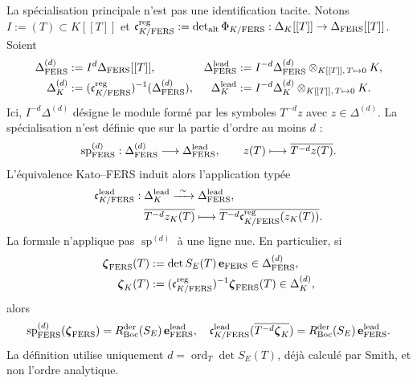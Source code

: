La spécialisation principale n'est pas une identification tacite. Notons
$I:=(T)\subset K[[T]]$ et
$\mathfrak c_{K/{\rm FERS}}^{\rm reg}:=
\det_{\rm alt}\Phi_{K/{\rm FERS}}:\Delta_K[[T]]\to
\Delta_{\rm FERS}[[T]]$. Soient
\begin{equation}\label{eq:pdf2-bsd-lineas-leading}
 \begin{aligned}
  \Delta_{\rm FERS}^{(d)}&:=I^d\Delta_{\rm FERS}[[T]],&
  \Delta_{\rm FERS}^{\rm lead}
    &:=I^{-d}\Delta_{\rm FERS}^{(d)}
       \otimes_{K[[T]],\,T\mapsto0}K,\\
  \Delta_K^{(d)}&:=(\mathfrak c_{K/{\rm FERS}}^{\rm reg})^{-1}
       (\Delta_{\rm FERS}^{(d)}),&
  \Delta_K^{\rm lead}
    &:=I^{-d}\Delta_K^{(d)}
       \otimes_{K[[T]],\,T\mapsto0}K.
 \end{aligned}
\end{equation}
Ici, $I^{-d}\Delta^{(d)}$ désigne le module formé par les symboles
$T^{-d}z$ avec $z\in\Delta^{(d)}$. La spécialisation n'est définie
que sur la partie d'ordre au moins $d$ :
\begin{equation}\label{eq:pdf2-bsd-sp-leading-tipado}
 \operatorname{sp}^{(d)}_{\rm FERS}:
 \Delta_{\rm FERS}^{(d)}\longrightarrow
 \Delta_{\rm FERS}^{\rm lead},
 \qquad
 z(T)\longmapsto
 \overline{T^{-d}z(T)}.
\end{equation}
L'équivalence Kato--FERS induit alors l'application typée
\begin{equation}\label{eq:pdf2-bsd-c-k-fers-leading}
 \begin{aligned}
 \mathfrak c_{K/{\rm FERS}}^{\rm lead}:{}
 &\Delta_K^{\rm lead}\xrightarrow{\ \sim\ }
   \Delta_{\rm FERS}^{\rm lead},\\
 &\overline{T^{-d}z_K(T)}\longmapsto
   \overline{T^{-d}
   \mathfrak c_{K/{\rm FERS}}^{\rm reg}(z_K(T))}.
 \end{aligned}
\end{equation}
La formule n'applique pas $\operatorname{sp}^{(d)}$ à une ligne nue. En
particulier, si
\begin{equation}\label{eq:pdf2-bsd-seccion-zeta-leading}
 \begin{aligned}
  \boldsymbol\zeta_{\rm FERS}(T)
    &:=\det S_E(T)\,\mathbf e_{\rm FERS}
       \in\Delta_{\rm FERS}^{(d)},\\
  \boldsymbol\zeta_K(T)
    &:=(\mathfrak c_{K/{\rm FERS}}^{\rm reg})^{-1}
       \boldsymbol\zeta_{\rm FERS}(T)
       \in\Delta_K^{(d)},
 \end{aligned}
\end{equation}
alors
\begin{equation}\label{eq:pdf2-bsd-especializacion-zeta}
 \operatorname{sp}^{(d)}_{\rm FERS}
       (\boldsymbol\zeta_{\rm FERS})
 =R_{\rm Boc}^{\rm der}(S_E)\,
       \mathbf e_{\rm FERS}^{\rm lead},
 \quad
 \mathfrak c_{K/{\rm FERS}}^{\rm lead}
       (\overline{T^{-d}\boldsymbol\zeta_K})
 =R_{\rm Boc}^{\rm der}(S_E)\,
       \mathbf e_{\rm FERS}^{\rm lead}.
\end{equation}
La définition utilise uniquement $d=\operatorname{ord}_T\det S_E(T)$, déjà calculé par
Smith, et non l'ordre analytique.

